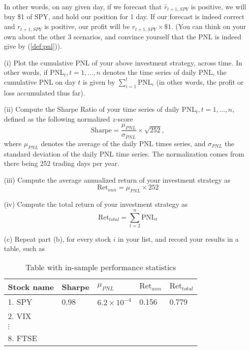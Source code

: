 \documentclass[12pt]{article}
\begin{document}
In other words, on any given day, if we forecast that $\hat{r}_{t+1,SPY}$ is positive, we will buy \$1 of SPY, and hold our position for 1 day. If our forecast is indeed correct and $r_{t+1,SPY}$ is positive, our profit will be $r_{t+1,SPY} \times \$ 1 $. (You can think on your own about the other 3 scenarios, and convince yourself that the PNL is indeed give by (\ref{def:pnl})). 

(i) Plot the cumulative PNL of your above investment strategy, across time. In other words, if PNL$_t, t=1,\ldots,n$ denotes the time series of daily PNL, the cumulative PNL on day $t$ is given by $ \sum_{i=1}^{t}  \mbox{PNL}_{i} $ (in other words, the profit or loss accumulated thus far).

(ii) Compute the Sharpe Ratio of your time series of daily PNL$_t, t=1,\ldots,n$, defined as the following normalized $z$-score
$$ \mbox{Sharpe} = \frac{ \mu_{PNL} }{ \sigma_{PNL} } \times \sqrt{252}, $$
where $\mu_{PNL}$ denotes the  average of the daily PNL times series, and $\sigma_{PNL} $ the standard deviation of the daily PNL time series. The normalization comes from there being 252 trading days per year. 

(iii) Compute the average annualized return of your investment strategy as 
$$ \mbox{Ret}_{ann}  = \mu_{PNL} \times 252 $$

(iv) Compute the  total return of your investment strategy as
$$ \mbox{Ret}_{total}  = \sum_{t=2}^{n} \mbox{PNL}_{t}  $$

(c) Repeat part (b), for every stock $i$ in your list, and record your results in a table, such as

\begin{table}[h!]
\begin{minipage}[b]{0.99\linewidth}
\centering
\begin{tabular}{ |l|l|l|l|l| }
\hline
Stock name & Sharpe & $\mu_{PNL}$ & $\mbox{Ret}_{ann} $ & $\mbox{Ret}_{total} $ \\ 
  \hline
1. SPY  &   0.98  &  $6.2 \times 10^{-4}$ & 0.156  &   0.779   \\  \hline
2. VIX  &     & & &   \\        \hline
$\vdots$  &     & & &   \\        \hline
8. FTSE  &     & & &   \\        \hline
\end{tabular}
\caption{Table with in-sample performance statistics}
\label{tab:table_in_sample}
\end{minipage}
\end{table}
\end{document}
